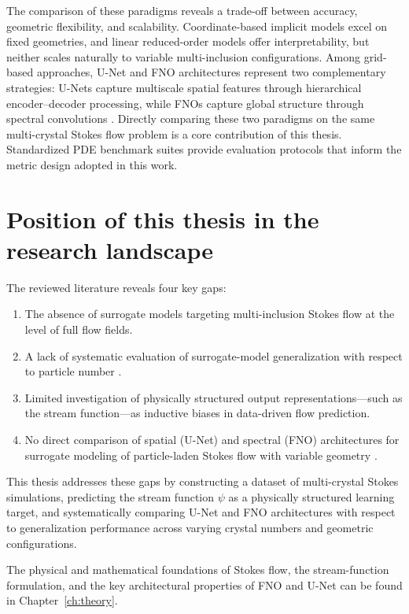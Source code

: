 The comparison of these paradigms reveals a trade-off between accuracy, geometric flexibility, and scalability. Coordinate-based implicit models excel on fixed geometries, and linear reduced-order models offer interpretability, but neither scales naturally to variable multi-inclusion configurations. Among grid-based approaches, U-Net and FNO architectures represent two complementary strategies: U-Nets capture multiscale spatial features through hierarchical encoder–decoder processing, while FNOs capture global structure through spectral convolutions \parencite{lu_comprehensive_2022}. Directly comparing these two paradigms on the same multi-crystal Stokes flow problem is a core contribution of this thesis. Standardized PDE benchmark suites \parencite{takamoto_pdebench_nodate} provide evaluation protocols that inform the metric design adopted in this work.

\section{Position of this thesis in the research landscape}

The reviewed literature reveals four key gaps:

\begin{enumerate}
    \item The absence of surrogate models targeting multi-inclusion Stokes flow at the level of full flow fields.
    \item A lack of systematic evaluation of surrogate-model generalization with respect to particle number \parencite{morimoto_generalization_2022}.
    \item Limited investigation of physically structured output representations—such as the stream function—as inductive biases in data-driven flow prediction.
    \item No direct comparison of spatial (U-Net) and spectral (FNO) architectures for surrogate modeling of particle-laden Stokes flow with variable geometry \parencite{lu_comprehensive_2022}.
\end{enumerate}

This thesis addresses these gaps by constructing a dataset of multi-crystal Stokes simulations, predicting the stream function $\psi$ as a physically structured learning target, and systematically comparing U-Net and FNO architectures with respect to generalization performance across varying crystal numbers and geometric configurations.

The physical and mathematical foundations of Stokes flow, the stream-function formulation, and the key architectural properties of FNO and U-Net can be found in Chapter~\ref{ch:theory}.
